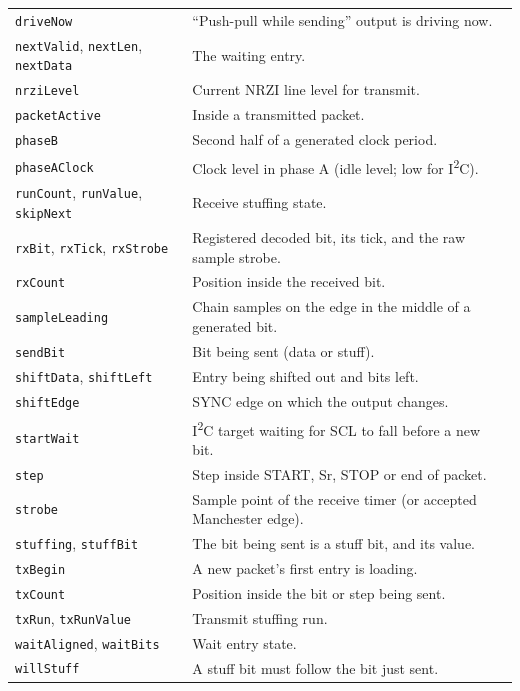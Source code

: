 \documentclass[11pt,a4paper]{article}
\newcommand{\sig}[1]{\texttt{#1}}
\begin{document}
\begin{longtable}{@{}l p{11cm}@{}}
\sig{driveNow} & ``Push-pull while sending'' output is driving now. \\
\sig{nextValid}, \sig{nextLen}, \sig{nextData} & The waiting entry. \\
\sig{nrziLevel} & Current NRZI line level for transmit. \\
\sig{packetActive} & Inside a transmitted packet. \\
\sig{phaseB} & Second half of a generated clock period. \\
\sig{phaseAClock} & Clock level in phase A (idle level; low for I\textsuperscript{2}C). \\
\sig{runCount}, \sig{runValue}, \sig{skipNext} & Receive stuffing state. \\
\sig{rxBit}, \sig{rxTick}, \sig{rxStrobe} & Registered decoded bit, its tick, and the raw sample strobe. \\
\sig{rxCount} & Position inside the received bit. \\
\sig{sampleLeading} & Chain samples on the edge in the middle of a generated bit. \\
\sig{sendBit} & Bit being sent (data or stuff). \\
\sig{shiftData}, \sig{shiftLeft} & Entry being shifted out and bits left. \\
\sig{shiftEdge} & SYNC edge on which the output changes. \\
\sig{startWait} & I\textsuperscript{2}C target waiting for SCL to fall before a new bit. \\
\sig{step} & Step inside START, Sr, STOP or end of packet. \\
\sig{strobe} & Sample point of the receive timer (or accepted Manchester edge). \\
\sig{stuffing}, \sig{stuffBit} & The bit being sent is a stuff bit, and its value. \\
\sig{txBegin} & A new packet's first entry is loading. \\
\sig{txCount} & Position inside the bit or step being sent. \\
\sig{txRun}, \sig{txRunValue} & Transmit stuffing run. \\
\sig{waitAligned}, \sig{waitBits} & Wait entry state. \\
\sig{willStuff} & A stuff bit must follow the bit just sent. \\
\bottomrule
\end{longtable}
\end{document}
